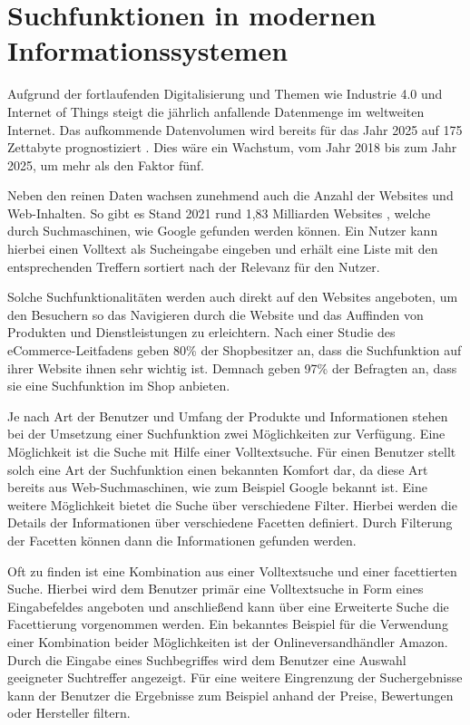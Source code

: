 \section{Suchfunktionen in modernen Informationssystemen\label{sec2.3:Unterpunkt-3}}

Aufgrund der fortlaufenden Digitalisierung und Themen wie \glqq Industrie 4.0\grqq{} und \glqq Internet of Things\grqq{} steigt die jährlich anfallende Datenmenge im weltweiten Internet. Das aufkommende Datenvolumen wird bereits für das Jahr 2025 auf 175 Zettabyte prognostiziert \cite{F.Tenzer.2018}. Dies wäre ein Wachstum, vom Jahr 2018 bis zum Jahr 2025, um mehr als den Faktor fünf.

Neben den reinen Daten wachsen zunehmend auch die Anzahl der Websites und Web-Inhalten. So gibt es Stand 2021 rund 1,83 Milliarden Websites \cite{GuyFawkes.2021}, welche durch Suchmaschinen, wie Google gefunden werden können. Ein Nutzer kann hierbei einen Volltext als Sucheingabe eingeben und erhält eine Liste mit den entsprechenden Treffern sortiert nach der Relevanz für den Nutzer.

Solche Suchfunktionalitäten werden auch direkt auf den Websites angeboten, um den Besuchern so das Navigieren durch die Website und das Auffinden von Produkten und Dienstleistungen zu erleichtern. Nach einer Studie des eCommerce-Leitfadens \cite{AaronSchrettenbrunner.} geben 80\% der Shopbesitzer an, dass die Suchfunktion auf ihrer Website ihnen \glqq sehr wichtig\grqq{} ist. Demnach geben 97\% der Befragten an, dass sie eine Suchfunktion im Shop anbieten.

Je nach Art der Benutzer und Umfang der Produkte und Informationen stehen bei der Umsetzung einer Suchfunktion zwei Möglichkeiten zur Verfügung. Eine Möglichkeit ist die Suche mit Hilfe einer Volltextsuche. Für einen Benutzer stellt solch eine Art der Suchfunktion einen bekannten Komfort dar, da diese Art bereits aus Web-Suchmaschinen, wie zum Beispiel Google bekannt ist. Eine weitere Möglichkeit bietet die Suche über verschiedene Filter. Hierbei werden die Details der Informationen über verschiedene Facetten definiert. Durch Filterung der Facetten können dann die Informationen gefunden werden.

Oft zu finden ist eine Kombination aus einer Volltextsuche und einer facettierten Suche. Hierbei wird dem Benutzer primär eine Volltextsuche in Form eines Eingabefeldes angeboten und anschließend kann über eine \glqq Erweiterte Suche\grqq{} die Facettierung vorgenommen werden. Ein bekanntes Beispiel für die Verwendung einer Kombination beider Möglichkeiten ist der Onlineversandhändler \glqq Amazon\grqq{}. Durch die Eingabe eines Suchbegriffes wird dem Benutzer eine Auswahl geeigneter Suchtreffer angezeigt. Für eine weitere Eingrenzung der Suchergebnisse kann der Benutzer die Ergebnisse zum Beispiel anhand der Preise, Bewertungen oder Hersteller filtern.

